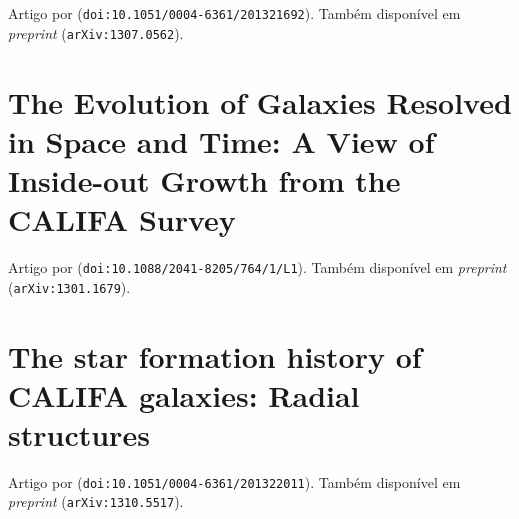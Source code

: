 Artigo por \cite{CidFernandes2014} (\texttt{doi:10.1051/0004-6361/201321692}).
Também disponível em {\em preprint} (\texttt{arXiv:1307.0562}).

\cleardoublepage



\cleardoublepage


\section{The Evolution of Galaxies Resolved in Space and Time: A View of
Inside-out Growth from the CALIFA Survey}
\label{apendice:InsideOut}

Artigo por \cite{Perez2013} (\texttt{doi:10.1088/2041-8205/764/1/L1}).
Também disponível em {\em preprint} (\texttt{arXiv:1301.1679}).

\cleardoublepage



\cleardoublepage


\section{The star formation history of CALIFA galaxies: Radial structures}
\label{apendice:RadStruct}

Artigo por \cite{GonzalezDelgado2014a}
(\texttt{doi:10.1051/0004-6361/201322011}).
Também disponível em {\em preprint} (\texttt{arXiv:1310.5517}).

\cleardoublepage



\cleardoublepage

